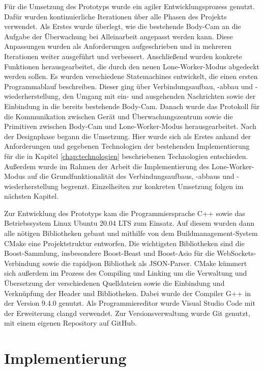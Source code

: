 \documentclass[thesis.tex]{subfiles}
\begin{document}
Für die Umsetzung des Prototyps wurde ein agiler Entwicklungsprozess genutzt.
Dafür wurden kontinuierliche Iterationen über alle Phasen des Projekts verwendet.
Als Erstes wurde überlegt, wie die bestehende Body-Cam an die Aufgabe der Überwachung bei Alleinarbeit angepasst werden kann.
Diese Anpassungen wurden als Anforderungen aufgeschrieben und in mehreren Iterationen weiter ausgeführt und verbessert.
Anschließend wurden konkrete Funktionen herausgearbeitet, die durch den neuen Lone-Worker-Modus abgedeckt werden sollen.
Es wurden verschiedene Statemachines entwickelt, die einen ersten Programmablauf beschreiben.
Dieser ging über Verbindungsaufbau, -abbau und -wiederherstellung, den Umgang mit ein- und ausgehenden Nachrichten sowie der Einbindung in die bereits bestehende Body-Cam.
Danach wurde das Protokoll für die Kommunikation zwischen Gerät und Überwachungszentrum sowie die Primitiven zwischen Body-Cam und Lone-Worker-Modus herausgearbeitet.
Nach der Designphase begann die Umsetzung.
Hier wurde sich als Erstes anhand der Anforderungen und gegebenen Technologien der bestehenden Implementierung für die in Kapitel \autoref{chap:technologien} beschriebenen Technologien entschieden.
Außerdem wurde im Rahmen der Arbeit die Implementierung des Lone-Worker-Modus auf die Grundfunktionalität des Verbindungsaufbaus, -abbaus und -wiederherstellung begrenzt.
Einzelheiten zur konkreten Umsetzung folgen im nächsten Kapitel.

Zur Entwicklung des Prototyps kam die Programmiersprache C++ sowie das Betriebssystem Linux Ubuntu 20.04 LTS zum Einsatz.
Auf diesem wurden dann alle nötigen Bibliotheken gebaut und mithilfe von dem Buildmanagement-System CMake eine Projektstruktur entworfen.
Die wichtigsten Bibliotheken sind die Boost-Sammlung, insbesondere Boost-Beast und Boost-Asio für die WebSockets-Verbindung sowie die \glqq rapidjson\grqq{} Bibliothek als JSON-Parser.
CMake kümmert sich außerdem im Prozess des Compiling und Linking um die Verwaltung und Übersetzung der verschiedenen Quelldateien
sowie die Einbindung und Verknüpfung der Header und Bibliotheken.
Dabei wurde der Compiler G++ in der Version 9.4.0 genutzt.
Als Programmiereditor wurde Visual Studio Code mit der Erweiterung \glqq clangd\grqq{} verwendet.
Zur Versionsverwaltung wurde Git genutzt, mit einem eigenen Repository auf GitHub.

\section{Implementierung}\label{chap:implementierung}
\end{document}
